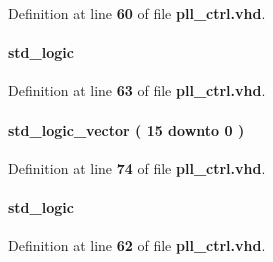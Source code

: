Definition at line {\bf 60} of file {\bf pll\+\_\+ctrl.\+vhd}.

\paragraph[{n\+\_\+byp}]{ {\bfseries \textcolor{comment}{std\+\_\+logic}\textcolor{vhdlchar}{ }} \hspace{0.3cm}{\ttfamily [Signal]}}\label{classpll__ctrl_1_1arch_a0d833c65ab506649c25a1e6b07f61a13}


Definition at line {\bf 63} of file {\bf pll\+\_\+ctrl.\+vhd}.

\paragraph[{n\+\_\+cnt}]{ {\bfseries \textcolor{comment}{std\+\_\+logic\+\_\+vector}\textcolor{vhdlchar}{ }\textcolor{vhdlchar}{(}\textcolor{vhdlchar}{ }\textcolor{vhdlchar}{ } \textcolor{vhdldigit}{15} \textcolor{vhdlchar}{ }\textcolor{keywordflow}{downto}\textcolor{vhdlchar}{ }\textcolor{vhdlchar}{ } \textcolor{vhdldigit}{0} \textcolor{vhdlchar}{ }\textcolor{vhdlchar}{)}\textcolor{vhdlchar}{ }} \hspace{0.3cm}{\ttfamily [Signal]}}\label{classpll__ctrl_1_1arch_aff6bff2445b0e096987ebbed7b9fc3e4}


Definition at line {\bf 74} of file {\bf pll\+\_\+ctrl.\+vhd}.

\paragraph[{n\+\_\+odddiv}]{ {\bfseries \textcolor{comment}{std\+\_\+logic}\textcolor{vhdlchar}{ }} \hspace{0.3cm}{\ttfamily [Signal]}}\label{classpll__ctrl_1_1arch_a943dfa5f77260507d4fe1fb3550ea56e}


Definition at line {\bf 62} of file {\bf pll\+\_\+ctrl.\+vhd}.

